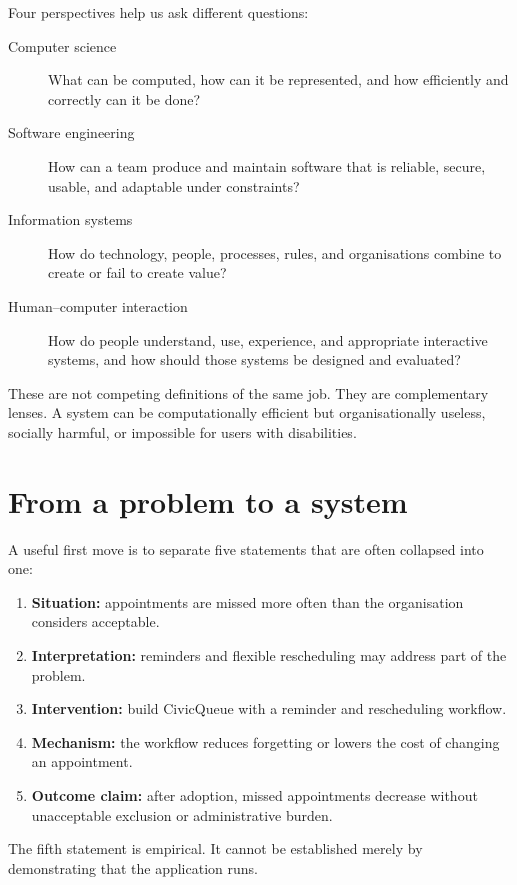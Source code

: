 Four perspectives help us ask different questions:
\begin{description}
\item[Computer science] What can be computed, how can it be represented, and how efficiently and correctly can it be done?
\item[Software engineering] How can a team produce and maintain software that is reliable, secure, usable, and adaptable under constraints?
\item[Information systems] How do technology, people, processes, rules, and organisations combine to create or fail to create value?
\item[Human--computer interaction] How do people understand, use, experience, and appropriate interactive systems, and how should those systems be designed and evaluated?
\end{description}

These are not competing definitions of the same job. They are complementary lenses. A system can be computationally efficient but organisationally useless, socially harmful, or impossible for users with disabilities.

\section{From a problem to a system}
A useful first move is to separate five statements that are often collapsed into one:
\begin{enumerate}
\item \textbf{Situation:} appointments are missed more often than the organisation considers acceptable.
\item \textbf{Interpretation:} reminders and flexible rescheduling may address part of the problem.
\item \textbf{Intervention:} build CivicQueue with a reminder and rescheduling workflow.
\item \textbf{Mechanism:} the workflow reduces forgetting or lowers the cost of changing an appointment.
\item \textbf{Outcome claim:} after adoption, missed appointments decrease without unacceptable exclusion or administrative burden.
\end{enumerate}
The fifth statement is empirical. It cannot be established merely by demonstrating that the application runs.

